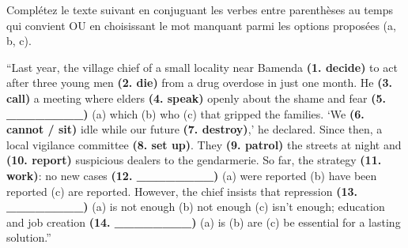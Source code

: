 \documentclass[11pt]{article}
\begin{document}
\begin{exercice}
Complétez le texte suivant en conjuguant les verbes entre parenthèses au temps qui convient OU en choisissant le mot manquant parmi les options proposées (a, b, c).
\begin{textebox}
“Last year, the village chief of a small locality near Bamenda \textbf{(1. decide)} to act after three young men \textbf{(2. die)} from a drug overdose in just one month. He \textbf{(3. call)} a meeting where elders \textbf{(4. speak)} openly about the shame and fear \textbf{(5. \_\_\_\_\_\_\_\_)} (a) which (b) who (c) that gripped the families. ‘We \textbf{(6. cannot / sit)} idle while our future \textbf{(7. destroy)},’ he declared. Since then, a local vigilance committee \textbf{(8. set up)}. They \textbf{(9. patrol)} the streets at night and \textbf{(10. report)} suspicious dealers to the gendarmerie. So far, the strategy \textbf{(11. work)}: no new cases \textbf{(12. \_\_\_\_\_\_\_\_)} (a) were reported (b) have been reported (c) are reported. However, the chief insists that repression \textbf{(13. \_\_\_\_\_\_\_\_)} (a) is not enough (b) not enough (c) isn't enough; education and job creation \textbf{(14. \_\_\_\_\_\_\_\_)} (a) is (b) are (c) be essential for a lasting solution.”
\end{textebox}
\end{exercice}
\end{document}
